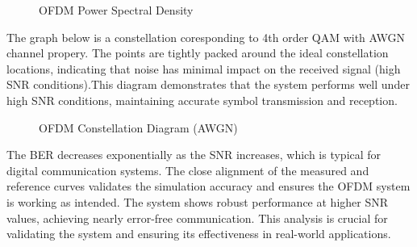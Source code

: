 \documentclass[conference]{IEEEtran}
\begin{document}
	\begin{figure}[H]
    		\centering
    		\caption{OFDM Power Spectral Density}
	\end{figure}

  The graph below is a constellation coresponding to 4th order QAM with AWGN channel propery.  The points are tightly packed around the ideal constellation locations, indicating that noise has minimal impact on the received signal (high SNR conditions).This diagram demonstrates that the system performs well under high SNR conditions, maintaining accurate symbol transmission and reception.
    
    
     \begin{figure}[H]
		\centering
    		\caption{OFDM Constellation Diagram  (AWGN) }
  	  \end{figure}
    
    The BER decreases exponentially as the SNR increases, which is typical for digital communication systems. The close alignment of the measured and reference curves validates the simulation accuracy and ensures the OFDM system is working as intended. The system shows robust performance at higher SNR values, achieving nearly error-free communication. This analysis is crucial for validating the system and ensuring its effectiveness in real-world applications.
    
\end{document}
